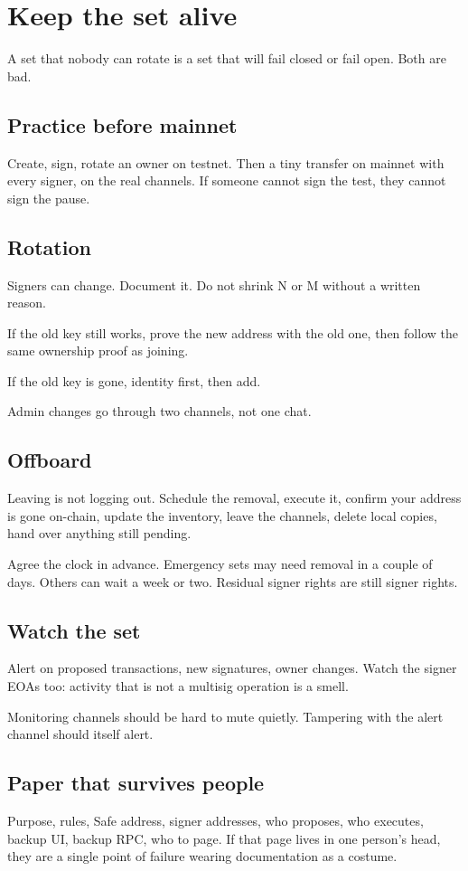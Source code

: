 \chapter{Keep the set alive}

A set that nobody can rotate is a set that will
fail closed or fail open. Both are bad.

\section{Practice before mainnet}

Create, sign, rotate an owner on testnet. Then a
tiny transfer on mainnet with every signer, on the
real channels. If someone cannot sign the test,
they cannot sign the pause.

\section{Rotation}

Signers can change. Document it. Do not shrink N
or M without a written reason.

If the old key still works, prove the new address
with the old one, then follow the same ownership
proof as joining.

If the old key is gone, identity first, then add.

Admin changes go through two channels, not one
chat.

\section{Offboard}

Leaving is not logging out. Schedule the removal,
execute it, confirm your address is gone on-chain,
update the inventory, leave the channels, delete
local copies, hand over anything still pending.

Agree the clock in advance. Emergency sets may
need removal in a couple of days. Others can wait
a week or two. Residual signer rights are still
signer rights.

\section{Watch the set}

Alert on proposed transactions, new signatures,
owner changes. Watch the signer EOAs too:
activity that is not a multisig operation is a
smell.

Monitoring channels should be hard to mute
quietly. Tampering with the alert channel should
itself alert.

\section{Paper that survives people}

Purpose, rules, Safe address, signer addresses,
who proposes, who executes, backup UI, backup
RPC, who to page. If that page lives in one
person's head, they are a single point of failure
wearing documentation as a costume.
